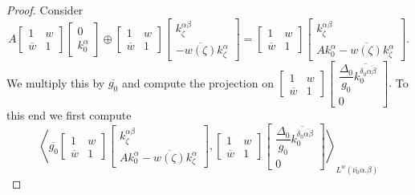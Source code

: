 \documentclass[reqno,11pt,centertags]{article}
\theoremstyle{definition}
\def\a{\alpha}
\def\b{\beta}
\def\d{\delta}
\def\D{\Delta}
\begin{document}
\begin{proof}
Consider
$$
A
\begin{bmatrix}
1 & w \\
\overline{w} & 1
\end{bmatrix}
\begin{bmatrix}
0
\\
k^\a_0
\end{bmatrix}
\oplus
\left[\begin{array}{cc} 1& w \\
\overline{w} & 1\end{array}\right]\left[\begin{array}{c} k^{\alpha\beta}_\zeta \\
-\overline{w(\zeta)} k^\alpha_\zeta \end{array}\right]
=
\left[\begin{array}{cc} 1& w \\
\overline{w} & 1\end{array}\right]\left[\begin{array}{c} k^{\alpha\beta}_\zeta \\
A k^\a_0-\overline{w(\zeta)} k^\alpha_\zeta \end{array}\right].
$$
We multiply this by $\overline{g_0}$ and compute the projection on
$\begin{bmatrix}
1 & w \\
\overline{w} & 1
\end{bmatrix}
\begin{bmatrix}
\dfrac{\D_0}{g_0}\overline{k^{\d_0\overline{\alpha\b}}_0}
\\
0
\end{bmatrix}.$
To this end we first compute
$$
\left\langle
\overline{g_0}
\left[\begin{array}{cc} 1& w \\
\overline{w} & 1\end{array}\right]\left[\begin{array}{c} k^{\alpha\beta}_\zeta \\
A k^\a_0-\overline{w(\zeta)} k^\alpha_\zeta \end{array}\right]
,
\begin{bmatrix}
1 & w \\
\overline{w} & 1
\end{bmatrix}
\begin{bmatrix}
\dfrac{\D_0}{g_0}\overline{k^{\d_0\overline{\alpha\b}}_0}
\\
0
\end{bmatrix}
\right\rangle_{L^w(\overline{\nu_0}\a.\b)}
$$
\end{proof}
\end{document}
